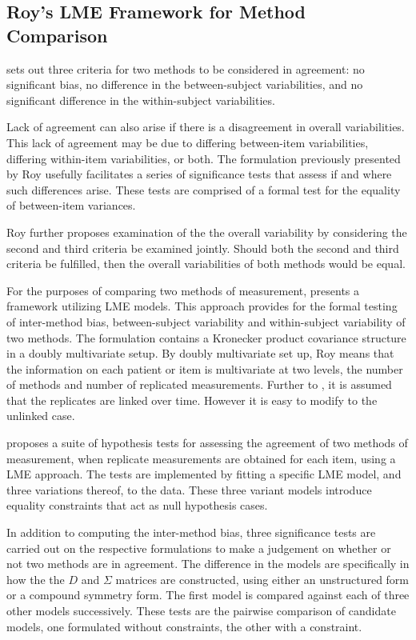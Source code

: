 \documentclass[12pt, a4paper]{report}
\theoremstyle{plain}
\theoremstyle{definition}
\theoremstyle{remark}
\begin{document}
	
	
	\subsection{Roy's LME Framework for Method Comparison }
	\citet{Barnhart} sets out three criteria for two methods to be considered in agreement: no significant bias, no difference in the between-subject variabilities, and no significant difference in the within-subject variabilities. 
	
	
	Lack of agreement can also arise if there is a disagreement in overall variabilities. This lack of agreement may be due to differing between-item variabilities, differing within-item variabilities, or both. The formulation previously presented by Roy usefully facilitates a series of significance tests that assess if and where such differences arise. These tests are comprised of a formal test for the equality of between-item variances. 
	
	Roy further proposes examination of the the overall variability by considering the second and third criteria be examined jointly. Should both the second and third criteria be fulfilled, then the overall variabilities of both methods would be equal.
	
	For the purposes of comparing two methods of measurement, \citet{ARoy2009} presents a framework utilizing LME models. This approach provides for the formal testing of inter-method bias, between-subject variability and within-subject variability of two methods. The formulation contains a Kronecker product covariance structure in a doubly multivariate setup. By doubly multivariate set up, Roy means that the information on each patient or item is multivariate at two levels, the number of methods and number of replicated measurements. Further to \citet{lam}, it is assumed that the replicates are linked over time. However it is easy to modify to the unlinked case.
	
\citet{ARoy2009} proposes a suite of hypothesis tests for assessing the agreement of two methods of measurement, when replicate measurements are obtained for each item, using a LME approach. The tests are implemented by fitting a specific LME model, and three variations thereof, to the data. These three variant models introduce equality constraints that act as null hypothesis cases.
	
In addition to computing the inter-method bias, three significance tests are carried out on the respective formulations to make a judgement on whether or not two methods are in agreement. The difference in the models are specifically in how the the $D$ and $\Sigma$ matrices are constructed, using either an unstructured form or a compound symmetry form. The first model is compared against each of three other models successively. These tests are the pairwise comparison of candidate models, one formulated without constraints, the other with a constraint.
	
\end{document}

